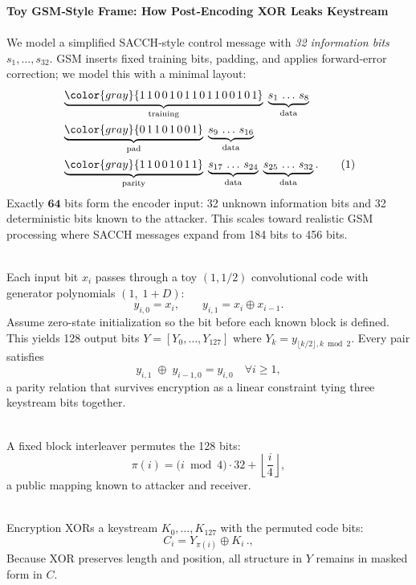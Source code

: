 \begin{technical}
{\Large\textbf{Toy GSM‑Style Frame: How Post‑Encoding XOR Leaks Keystream}}\\[0.3em]

\\[0.5em]
We model a simplified SACCH‑style control message with \textit{32 information bits} $s_1,\dots,s_{32}$.  
GSM inserts fixed training bits, padding, and applies forward‑error correction; we model this with a minimal layout:
\begin{align*}
&\underbrace{\color{gray}{1\,1\,0\,0\,1\,0\,1\,1\,0\,1\,1\,0\,0\,1\,0\,1}}_{\text{training}}\;
\underbrace{s_1\,\dots\,s_8}_{\text{data}}\\
&\underbrace{\color{gray}{0\,1\,1\,0\,1\,0\,0\,1}}_{\text{pad}}\;
\underbrace{s_9\,\dots\,s_{16}}_{\text{data}}\\
&\underbrace{\color{gray}{1\,1\,0\,0\,1\,0\,1\,1}}_{\text{parity}}\;
\underbrace{s_{17}\,\dots\,s_{24}}_{\text{data}}\;
\underbrace{s_{25}\,\dots\,s_{32}}_{\text{data}}.
\tag{1}
\end{align*}
Exactly \(\mathbf{64}\) bits form the encoder input: 32 unknown information bits and 32 deterministic bits known to the attacker. This scales toward realistic GSM processing where SACCH messages expand from 184 bits to 456 bits.

\\[0.5em]
Each input bit \(x_i\) passes through a toy \((1,1/2)\) convolutional code with generator polynomials \((1,\;1+D)\):
\[
y_{i,0}=x_i,
\qquad
y_{i,1}=x_i \oplus x_{i-1}.
\]
Assume zero-state initialization so the bit before each known block is defined. This yields 128 output bits \(Y=[Y_0,\dots,Y_{127}]\) where \(Y_k = y_{\lfloor k/2 \rfloor, k \bmod 2}\).  Every pair satisfies
\[
y_{i,1}\;\oplus\;y_{i-1,0}=y_{i,0}
\quad\forall i\ge 1,
\tag{2}
\]
a parity relation that survives encryption as a linear constraint tying three keystream bits together.

\\[0.5em]
A fixed block interleaver permutes the 128 bits:
\[
\pi(i)=\bigl(i\bmod4\bigr)\cdot32+\left\lfloor\frac{i}{4}\right\rfloor,
\tag{3}
\]
a public mapping known to attacker and receiver.

\\[0.5em]
Encryption XORs a keystream \(K_0,\dots,K_{127}\) with the permuted code bits:
\[
C_i = Y_{\pi(i)} \oplus K_i\,.
,\tag{4}
\]
Because XOR preserves length and position, all structure in \(Y\) remains in masked form in \(C\).


\end{technical}
